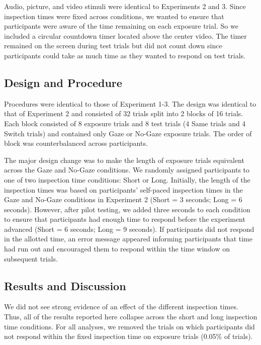 \documentclass[oneside]{report}
\begin{document}
Audio, picture, and video stimuli were identical to Experiments 2 and 3.
Since inspection times were fixed across conditions, we wanted to ensure
that participants were aware of the time remaining on each exposure
trial. So we included a circular countdown timer located above the
center video. The timer remained on the screen during test trials but
did not count down since participants could take as much time as they
wanted to respond on test trials.

\hypertarget{design-and-procedure-3}{%
\subsection{Design and Procedure}\label{design-and-procedure-3}}

Procedures were identical to those of Experiment 1-3. The design was
identical to that of Experiment 2 and consisted of 32 trials split into
2 blocks of 16 trials. Each block consisted of 8 exposure trials and 8
test trials (4 Same trials and 4 Switch trials) and contained only Gaze
or No-Gaze exposure trials. The order of block was counterbalanced
across participants.

The major design change was to make the length of exposure trials
equivalent across the Gaze and No-Gaze conditions. We randomly assigned
participants to one of two inspection time conditions: Short or Long.
Initially, the length of the inspection times was based on participants'
self-paced inspection times in the Gaze and No-Gaze conditions in
Experiment 2 (Short = 3 seconds; Long = 6 seconds). However, after pilot
testing, we added three seconds to each condition to ensure that
participants had enough time to respond before the experiment advanced
(Short = 6 seconds; Long = 9 seconds). If participants did not respond
in the allotted time, an error message appeared informing participants
that time had run out and encouraged them to respond within the time
window on subsequent trials.

\hypertarget{results-and-discussion-3}{%
\subsection{Results and Discussion}\label{results-and-discussion-3}}

We did not see strong evidence of an effect of the different inspection
times. Thus, all of the results reported here collapse across the short
and long inspection time conditions. For all analyses, we removed the
trials on which participants did not respond within the fixed inspection
time on exposure trials (0.05\% of trials).
\end{document}
